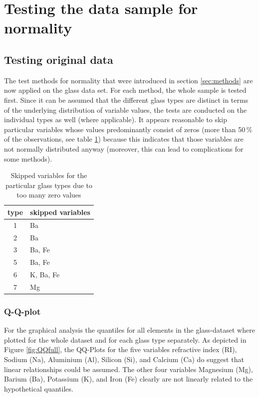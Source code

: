 \documentclass[a4paper, 12pt, titlepage, headsepline, listof = totoc, bibliography = totoc, numbers = noenddot]{scrartcl}
\begin{document}
\vfill


\newpage
\section{Testing the data sample for normality}\label{sec:testing}

\subsection{Testing original data}


The test methods for normality that were introduced in section \ref{sec:methods} are now applied on the glass data set. For each method, the whole sample is tested first. Since it can be assumed that the different glass types are distinct in terms of the underlying distribution of variable values, the tests are conducted on the individual types as well (where applicable). It appears reasonable to skip particular variables whose values predominantly consist of zeros (more than 50\,\% of the observations, see table \ref{tab:zeros}) because this indicates that those variables are not normally distributed anyway (moreover, this can lead to complications for some methods).

\begin{table}[h!]
\centering
\begin{tabular}{|cl|}
\hline
type & skipped variables\\
\hline
1 & Ba\\
2 & Ba\\
3 & Ba, Fe\\
5 & Ba, Fe\\
6 & K, Ba, Fe\\
7 & Mg\\
\hline
\end{tabular}
\caption{Skipped variables for the particular glass types due to too many zero values}
\label{tab:zeros}
\end{table}

\subsubsection{Q-Q-plot}\label{sec:qq-original}
For the graphical analysis the quantiles for all elements in the glass-dataset where plotted for the whole dataset and for each glass type separately. As depicted in Figure \ref{fig:QQfull}, the QQ-Plots for the five variables refractive index (RI), Sodium (Na), Aluminium (Al), Silicon (Si), and Calcium (Ca) do suggest that linear relationships could be assumed. The other four variables Magnesium (Mg), Barium (Ba), Potassium (K), and Iron (Fe) clearly are not linearly related to the hypothetical quantiles.
\end{document}
